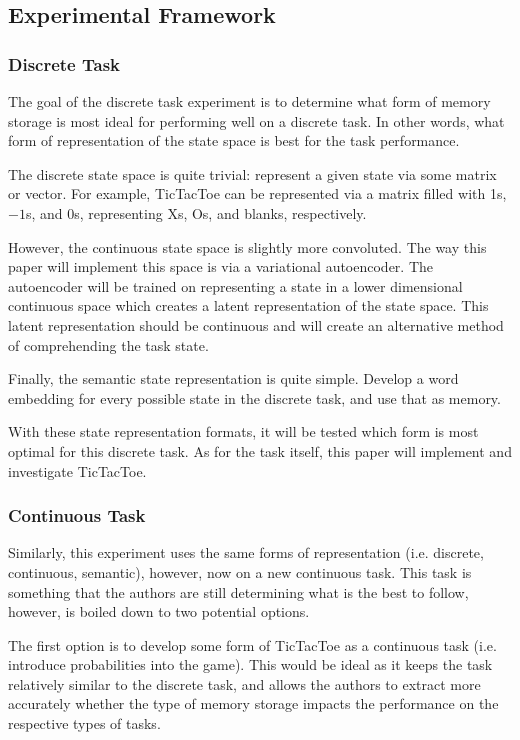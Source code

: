 \documentclass[11pt]{article}
\begin{document}
\subsection{Experimental Framework}
\subsubsection{Discrete Task}
The goal of the discrete task experiment is to determine what form of memory storage is most ideal for performing well on a discrete task. In other words, what form of representation of the state space is best for the task performance.

The discrete state space is quite trivial: represent a given state via some matrix or vector. For example, TicTacToe can be represented via a matrix filled with 1s, $-1$s, and 0s, representing Xs, Os, and blanks, respectively.

However, the continuous state space is slightly more convoluted. The way this paper will implement this space is via a variational autoencoder. The autoencoder will be trained on representing a state in a lower dimensional continuous space which creates a latent representation of the state space. This latent representation should be continuous and will create an alternative method of comprehending the task state.

Finally, the semantic state representation is quite simple. Develop a word embedding for every possible state in the discrete task, and use that as memory.

With these state representation formats, it will be tested which form is most optimal for this discrete task. As for the task itself, this paper will implement and investigate TicTacToe.

\subsubsection{Continuous Task}
Similarly, this experiment uses the same forms of representation (i.e. discrete, continuous, semantic), however, now on a new continuous task. This task is something that the authors are still determining what is the best to follow, however, is boiled down to two potential options.

The first option is to develop some form of TicTacToe as a continuous task (i.e. introduce probabilities into the game). This would be ideal as it keeps the task relatively similar to the discrete task, and allows the authors to extract more accurately whether the type of memory storage impacts the performance on the respective types of tasks.
\end{document}
